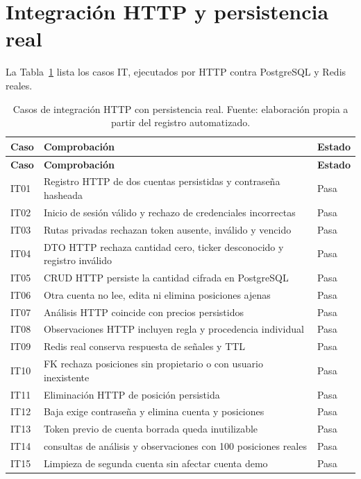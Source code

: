 \section*{Integración HTTP y persistencia real}
La Tabla~\ref{tab:casos-integracion} lista los casos IT, ejecutados por HTTP contra PostgreSQL y Redis reales.
\begin{longtable}{>{\raggedright\arraybackslash}p{}>{\raggedright\arraybackslash}p{}p{}}
\caption{Casos de integración HTTP con persistencia real. Fuente: elaboración propia a partir del registro automatizado.}\label{tab:casos-integracion}\\
\hline
\textbf{Caso} & \textbf{Comprobación} & \textbf{Estado}\\\hline\endfirsthead
\hline
\textbf{Caso} & \textbf{Comprobación} & \textbf{Estado}\\\hline\endhead
IT01 & Registro HTTP de dos cuentas persistidas y contraseña hasheada & Pasa \\\hline
IT02 & Inicio de sesión válido y rechazo de credenciales incorrectas & Pasa \\\hline
IT03 & Rutas privadas rechazan token ausente, inválido y vencido & Pasa \\\hline
IT04 & DTO HTTP rechaza cantidad cero, ticker desconocido y registro inválido & Pasa \\\hline
IT05 & CRUD HTTP persiste la cantidad cifrada en PostgreSQL & Pasa \\\hline
IT06 & Otra cuenta no lee, edita ni elimina posiciones ajenas & Pasa \\\hline
IT07 & Análisis HTTP coincide con precios persistidos & Pasa \\\hline
IT08 & Observaciones HTTP incluyen regla y procedencia individual & Pasa \\\hline
IT09 & Redis real conserva respuesta de señales y TTL & Pasa \\\hline
IT10 & FK rechaza posiciones sin propietario o con usuario inexistente & Pasa \\\hline
IT11 & Eliminación HTTP de posición persistida & Pasa \\\hline
IT12 & Baja exige contraseña y elimina cuenta y posiciones & Pasa \\\hline
IT13 & Token previo de cuenta borrada queda inutilizable & Pasa \\\hline
IT14 & 30 consultas de análisis y observaciones con 100 posiciones reales & Pasa \\\hline
IT15 & Limpieza de segunda cuenta sin afectar cuenta demo & Pasa \\\hline
\end{longtable}

